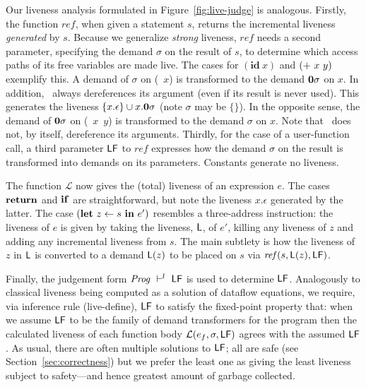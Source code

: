 \documentclass{sig-alternate}
\newcommand{\ID}{\mbox{$\mathbf{ id}$}} %
\begin{document}
Our  liveness analysis  formulated  in Figure~\ref{fig:live-judge}  is
analogous.
Firstly,  the function  $\mathit{ref}$,  when given  a statement  $s$,
returns the  incremental liveness {\em generated} by  $s$.  Because we
generalize  {\em  strong}  liveness,  $\mathit{ref}$  needs  a  second
parameter, specifying  the demand  $\sigma$ on the  result of  $s$, to
determine which access paths of its free variables are made live.  The
cases for $(\ID\ x)$ and $(\mbox{$\mathbf{ +}$}\ x\ y)$ exemplify this.
A demand  of  $\sigma$  on  (\CAR~$x$)  is  transformed  to  the  demand
$\mathbf{0}\sigma$  on  $x$.   In  addition, \CAR\  always  dereferences  its
argument (even if its result is never used).
This generates the liveness  $\{x.\epsilon\} \cup  x.\mathbf{0}\sigma$
(note $\sigma$ may be $\{\}$).
In the opposite  sense, the  demand  of $\mathbf{0}\sigma$  on
(\CONS~$x$~$y$) is  transformed to the  demand $\sigma$ on  $x$.  Note
that \CONS\ does not, by itself, dereference its arguments.
Thirdly, for the case of a user-function call, a third parameter $\mathsf{LF}$ to 
$\mathit{ref}$
expresses how the demand $\sigma$ on the result is transformed into demands on its parameters.
Constants generate no liveness.

The  function  $\mathcal{L}$ now  gives  the  (total)  liveness of  an
expression $e$.   The cases $\mbox{$\mathbf{ return}$}$ and  $\mbox{$\mathbf{ if}$}$ are straightforward,
but note the liveness $x.\epsilon$  generated by the latter.  The case
$(\mbox{$\mathbf{ let}$}\   z\leftarrow   s\  \mbox{$\mathbf{ in}$}\   e')$   resembles  a   three-address
instruction:  the liveness  of $e$  is given  by taking  the liveness,
$\mathsf{L}$, of $e'$, killing any liveness of $z$ and adding any incremental
liveness from  $s$.  The main subtlety  is how the liveness  of $z$ in
$\mathsf{L}$  is converted  to a  demand  $\mathsf{L}(z)$ to  be placed  on $s$  via
$\mathit{ref}(s,\mathsf{L}(z),\mathsf{LF})$.

Finally, the  judgement form $\mathit{Prog}  \ \vdash^l\  \mathsf{LF}$ is  used to
determine  $\mathsf{LF}$\@.   Analogously   to  classical  liveness  being
computed  as  a  solution  of  dataflow  equations,  we  require,  via
inference   rule  ({\sc  live-define}),   $\mathsf{LF}$  to   satisfy  the
fixed-point property that:  when we assume $\mathsf{LF}$ to  be the family
of demand transformers for the program then the calculated liveness of
each function  body $\mathcal{L}(e_f,\sigma,\mathsf{LF})$ agrees  with the
assumed $\mathsf{LF}$.   As usual, there  are often multiple  solutions to
$\mathsf{LF}$;  all are  safe (see  Section~\ref{sec:correctness})  but we
prefer  the  least  one  as  giving  the  least  liveness  subject  to
safety---and hence greatest amount of garbage collected.
\end{document}
